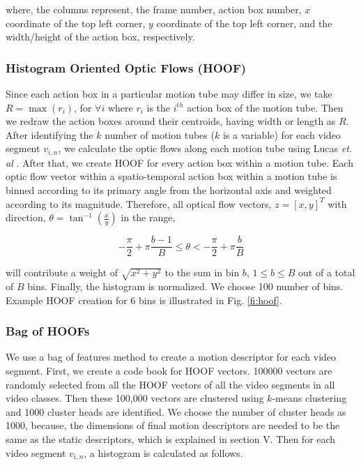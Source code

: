 where, the columns represent, the frame number, action box number, $x$ coordinate of the top left corner,
$y$ coordinate of the top left corner, and the width/height of the action box, respectively.

\subsubsection{Histogram Oriented Optic Flows (HOOF)}
Since each action box in a particular motion tube may differ in size, we take $R = \max(r_{i})$, for $\forall{i}$
where $r_{i}$ is the $i^{th}$ action box of the motion tube. Then we redraw the action boxes around their centroids, having width or length as $R$.
After identifying the $k$ number of motion tubes ($k$ is a variable) for each video segment $v_{i,n}$, we calculate the optic flows along each motion tube
using Lucas \textit{et. al} \cite{lucas1981iterative}.
After that, we create HOOF\cite{chaudhry2009histograms} for every
action box within a motion tube. Each optic flow vector within a spatio-temporal action box within a motion tube is binned according
to its primary angle from the horizontal axis and weighted according to its magnitude.  Therefore, all optical flow vectors, $z=[x,y]^T$ with direction,
$\theta = \tan^{-1}(\frac{x}{y})$ in the range,

\begin{equation}
- \frac{\pi}{2} + \pi\frac{b-1}{B} \leq \theta < -\frac{\pi}{2} + \pi\frac{b}{B}
\end{equation}

will contribute a weight of $\sqrt{x^2 + y^2}$ to the sum in bin $b$, $1 \leq b \leq B$ out of a total of
$B$ bins. Finally, the histogram is normalized. We choose 100 number of bins. Example HOOF creation for 6 bins is illustrated in Fig. \ref{fi:hoof}.

\subsubsection{Bag of HOOFs}
We use a bag of features method to create a motion descriptor for each video segment. First, we create a code book for HOOF vectors.
100000 vectors are randomly selected from all the HOOF vectors of all the video segments in all video classes.
Then these 100,000 vectors are clustered using $k$-means clustering and 1000 cluster heads
are identified. We choose the number of cluster heads as 1000, because, the dimensions of final motion descriptors are needed to be the same as
the static descriptors, which is explained in section V. Then for each video segment $v_{i,n}$, a histogram is calculated as follows.


